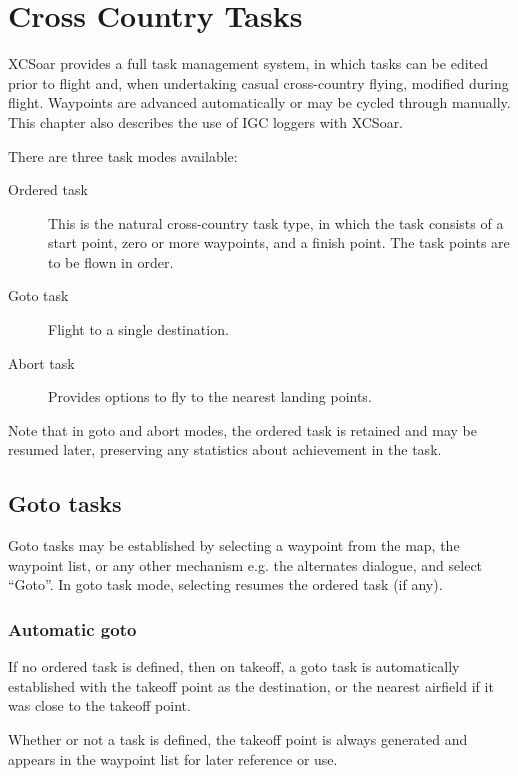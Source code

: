 \chapter{Cross Country Tasks}\label{cha:tasks}

XCSoar provides a full task management system, in which tasks can be
edited prior to flight and, when undertaking casual cross-country
flying, modified during flight.  Waypoints are advanced automatically
or may be cycled through manually.  This chapter also describes the
use of IGC loggers with XCSoar.

There are three task modes available:
\begin{description}
\item[Ordered task] This is the natural cross-country task type,
in which the task consists of a start point, zero or more waypoints,
and a finish point.  The task points are to be flown in order.
\item[Goto task] Flight to a single destination.
\item[Abort task] Provides options to fly to the nearest landing points.
\end{description}

Note that in goto and abort modes, the ordered task is retained and may be resumed
later, preserving any statistics about achievement in the task.

\section{Goto tasks}

Goto tasks may be established by selecting a waypoint from the map,
the waypoint list, or any other mechanism e.g. the alternates dialogue,
 and select ``Goto''.  In goto task mode, selecting
\blink{} resumes the ordered task (if
any).

\subsection*{Automatic goto}

If no ordered task is defined, then on takeoff, a goto task is automatically
established with the takeoff point as the destination, or the nearest airfield
if it was close to the takeoff point.

Whether or not a task is defined, the takeoff point is always
generated and appears in the waypoint list for later reference or use.

